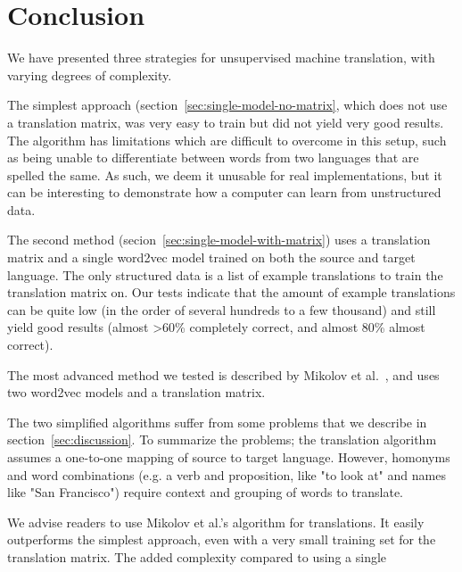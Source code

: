 \section{Conclusion}
We have presented three strategies for unsupervised machine translation, with varying degrees of complexity.

The simplest approach (section~\ref{sec:single-model-no-matrix}, which does not use a translation matrix, was very easy to train but did not yield very good results. The algorithm has limitations which are difficult to overcome in this setup, such as being unable to differentiate between words from two languages that are spelled the same. As such, we deem it unusable for real implementations, but it can be interesting to demonstrate how a computer can learn from unstructured data.

The second method (secion~\ref{sec:single-model-with-matrix}) uses a translation matrix and a single word2vec model trained on both the source and target language. The only structured data is a list of example translations to train the translation matrix on. Our tests indicate that the amount of example translations can be quite low (in the order of several hundreds to a few thousand) and still yield good results (almost >60\% completely correct, and almost 80\% almost correct).

The most advanced method we tested is described by Mikolov et al.~\cite{mikolov2013exploiting}, and uses two word2vec models and a translation matrix. 

The two simplified algorithms suffer from some problems that we describe in section~\ref{sec:discussion}. To summarize the problems; the translation algorithm assumes a one-to-one mapping of source to target language. However, homonyms and word combinations (e.g. a verb and proposition, like "to look at" and names like "San Francisco") require context and grouping of words to translate.

We advise readers to use Mikolov et al.'s algorithm for translations. It easily outperforms the simplest approach, even with a very small training set for the translation matrix. The added complexity compared to using a single 
